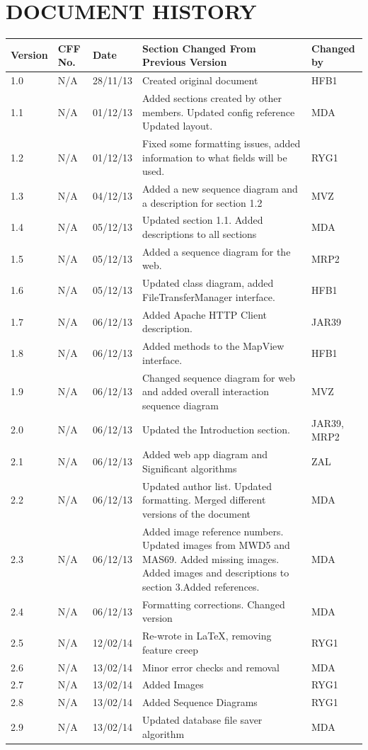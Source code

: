 \documentclass[12pt]{article}
\begin{document}
\section{DOCUMENT HISTORY}
\setlength\LTleft{-0.5cm}
\begin{longtable}{|p{1.3cm}|p{1.5cm}|p{2cm}|p{7cm}| p{2cm}|}
\hline
	Version & CFF No. & Date & Section Changed From Previous Version & Changed by \\
\hline
	1.0 & N/A & 28/11/13 & Created original document & HFB1 \\ 
\hline
	1.1 & N/A & 01/12/13 & Added sections created by other members. 
Updated config reference 
Updated layout. & MDA
 \\
\hline
	1.2 & N/A & 01/12/13 & Fixed some formatting issues, added information to what fields will be used. & RYG1 \\
\hline 
	1.3 & N/A & 04/12/13 & Added a new sequence diagram and a description for section 1.2 & MVZ
\\
\hline 
	1.4 & N/A & 05/12/13 & Updated section 1.1. Added descriptions to all sections & MDA \\
\hline 
	1.5 & N/A & 05/12/13 & Added a sequence diagram for the web.
 & MRP2 \\
\hline
	1.6 & N/A & 05/12/13 & Updated class diagram, added FileTransferManager interface. & HFB1 \\
\hline 
	1.7 & N/A & 06/12/13 & Added Apache HTTP Client description. & JAR39 \\
\hline 
	1.8 & N/A & 06/12/13 & Added methods to the MapView interface. & HFB1
 \\
\hline	
	1.9 &N/A&06/12/13&Changed sequence diagram for web and added
overall interaction sequence diagram & MVZ\\
\hline 
	2.0&N/A&06/12/13&Updated the Introduction section.&JAR39,
MRP2 \\
\hline
	2.1&N/A&06/12/13&Added web app diagram and Significant algorithms &ZAL \\
\hline 
	2.2&N/A&06/12/13&Updated author list. Updated formatting. Merged different versions of the document&MDA\\
\hline
	2.3&N/A&06/12/13& Added image reference numbers. Updated images 
from MWD5 and MAS69. Added missing images. Added images and descriptions to section 3.Added references. & MDA\\
\hline 
	2.4&N/A&06/12/13&Formatting corrections. Changed version&MDA \\
\hline 
	2.5&N/A&12/02/14&Re-wrote in LaTeX, removing feature creep &RYG1 \\
\hline
	2.6&N/A&13/02/14&Minor error checks and removal &MDA \\
 \hline
 	2.7&N/A&13/02/14&Added Images & RYG1\\
 \hline
 2.8&N/A&13/02/14&Added Sequence Diagrams &RYG1\\
 \hline
 2.9&N/A&13/02/14&Updated database file saver algorithm &MDA\\
 \hline
\end{longtable}
\end{document}
